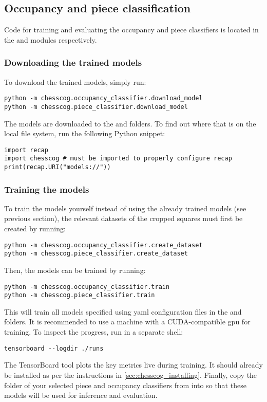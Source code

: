 \documentclass[../../report.tex]{subfiles}
\begin{document}
\subsection{Occupancy and piece classification}
Code for training and evaluating the occupancy and piece classifiers is located in the  and  modules respectively.
\subsubsection{Downloading the trained models}
\label{sec:chesscog_user_man_download_models}
To download the trained models, simply run:
\begin{verbatim}
python -m chesscog.occupancy_classifier.download_model
python -m chesscog.piece_classifier.download_model
\end{verbatim}
The models are downloaded to the  and  folders.
To find out where that is on the local file system, run the following Python snippet:
\begin{verbatim}
import recap
import chesscog # must be imported to properly configure recap
print(recap.URI("models://"))
\end{verbatim}
\subsubsection{Training the models}
\label{sec:chesscog_user_man_train}
To train the models yourself instead of using the already trained models (see previous section), the relevant datasets of the cropped squares must first be created by running:
\begin{verbatim}
python -m chesscog.occupancy_classifier.create_dataset
python -m chesscog.piece_classifier.create_dataset
\end{verbatim}
Then, the models can be trained by running:
\begin{verbatim}
python -m chesscog.occupancy_classifier.train
python -m chesscog.piece_classifier.train
\end{verbatim}
This will train all models specified using \gls{yaml} configuration files in the  and  folders.
It is recommended to use a machine with a CUDA-compatible \gls{gpu} for training.
To inspect the progress, run in a separate shell:
\begin{verbatim}
tensorboard --logdir ./runs
\end{verbatim}
The TensorBoard tool plots the key metrics live during training.
It should already be installed as per the instructions in \cref{sec:chesscog_installing}.
Finally, copy the folder of your selected piece and occupancy classifiers from  into  so that these models will be used for inference and evaluation.
\end{document}
